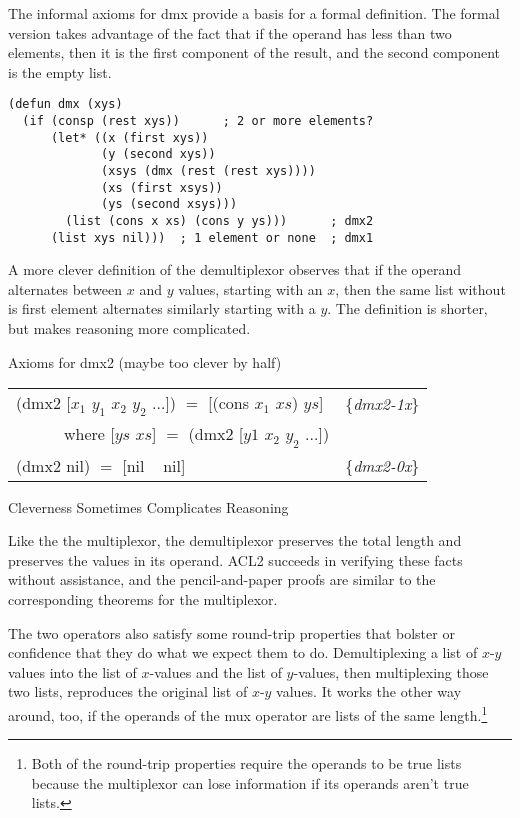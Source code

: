 The informal axioms for dmx provide a basis for a formal definition.
The formal version takes advantage of the fact that if the operand
has less than two elements, then it is the first component of the result,
and the second component is the empty list.

\label{dmx-defun}
\begin{Verbatim}
(defun dmx (xys)
  (if (consp (rest xys))      ; 2 or more elements?
      (let* ((x (first xys))
             (y (second xys))
             (xsys (dmx (rest (rest xys))))
             (xs (first xsys))
             (ys (second xsys)))
        (list (cons x xs) (cons y ys)))      ; dmx2
      (list xys nil)))  ; 1 element or none  ; dmx1
\end{Verbatim}

\begin{aside}
A more clever definition of the demultiplexor
observes that if the operand alternates between $x$ and $y$ values,
starting with an $x$,
then the same list without is first element alternates similarly
starting with a $y$. The definition is shorter,
but makes reasoning more complicated.\\
\begin{center}
Axioms for dmx2 (maybe too clever by half)
\begin{tabular}{ll}
(dmx2 [$x_1$ $y_1$ $x_2$ $y_2$ $\dots$]) $=$ [(cons $x_1$ $xs$) $ys$]  & \{\emph{dmx2-1x}\} \\
~~~~~~where [$ys$ $xs$] $=$ (dmx2 [$y1$ $x_2$ $y_2$ $\dots$])          & \\
(dmx2 nil) $=$ [nil ~ nil]                                             & \{\emph{dmx2-0x}\} \\
\end{tabular}
\end{center}
\caption{Cleverness Sometimes Complicates Reasoning}
\label{aside:dmx-defun-trick}
\end{aside}

Like the the multiplexor,
the demultiplexor preserves the total length
and preserves the values in its operand.
ACL2 succeeds in verifying these facts without assistance,
and the pencil-and-paper proofs are similar to the corresponding
theorems for the multiplexor.

The two operators also satisfy some round-trip properties
that bolster or confidence that they do what we expect them to do.
Demultiplexing a list of $x$-$y$ values into the list of
$x$-values and the list of $y$-values, then multiplexing
those two lists, reproduces the original list of $x$-$y$ values.
It works the other way around, too, if the operands of
the mux operator are lists of the same length.\footnote{Both
of the round-trip properties require the operands to be
true lists because the multiplexor can lose information
if its operands aren't true lists.}

